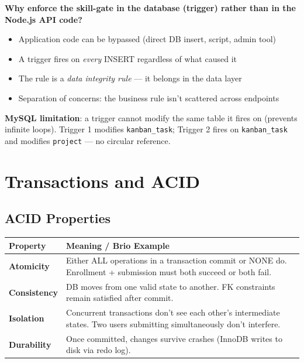 \documentclass[11pt,a4paper]{article}
\newcommand{\T}[1]{\texttt{#1}}          %
\begin{document}
\begin{whybox}
\textbf{Why enforce the skill-gate in the database (trigger) rather than in the Node.js
API code?}
\begin{itemize}[nosep, leftmargin=1.5em]
  \item Application code can be bypassed (direct DB insert, script, admin tool)
  \item A trigger fires on \textit{every} INSERT regardless of what caused it
  \item The rule is a \textit{data integrity rule} — it belongs in the data layer
  \item Separation of concerns: the business rule isn't scattered across endpoints
\end{itemize}
\end{whybox}

\begin{warnbox}
\textbf{MySQL limitation}: a trigger cannot modify the same table it fires on
(prevents infinite loops). Trigger 1 modifies \T{kanban\_task}; Trigger 2 fires on
\T{kanban\_task} and modifies \T{project} — no circular reference.
\end{warnbox}

\section{Transactions and ACID}

\subsection{ACID Properties}

\begin{center}
\renewcommand{\arraystretch}{1.3}
\begin{tabular}{@{}p{2.4cm}p{10cm}@{}}
\toprule
\textbf{Property} & \textbf{Meaning / Brio Example} \\
\midrule
\textbf{Atomicity}    & Either ALL operations in a transaction commit or NONE do. Enrollment + submission must both succeed or both fail. \\
\textbf{Consistency}  & DB moves from one valid state to another. FK constraints remain satisfied after commit. \\
\textbf{Isolation}    & Concurrent transactions don't see each other's intermediate states. Two users submitting simultaneously don't interfere. \\
\textbf{Durability}   & Once committed, changes survive crashes (InnoDB writes to disk via redo log). \\
\bottomrule
\end{tabular}
\end{center}
\end{document}
